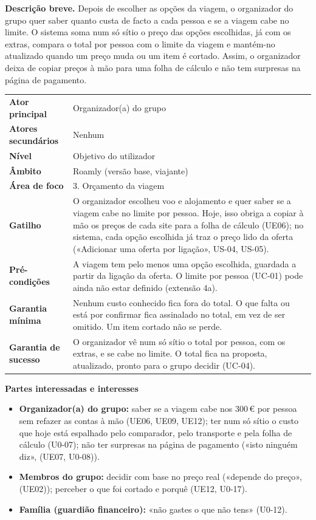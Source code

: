 \documentclass[11pt,a4paper]{article}
\newcommand{\reg}[1]{{\footnotesize\textcolor{pendente}{(#1)}}}
\newenvironment{usecase}[2]{%
  \par\medskip\noindent{\large\bfseries\color{roamly}#1: #2}\par\smallskip\small\noindent\ignorespaces}{\par\medskip}
\newcommand{\ucField}[2]{\textbf{#1} & #2 \\}
\begin{document}
\begin{usecase}{UC-02}{Saber o total real por pessoa}
\textbf{Descrição breve.} Depois de escolher as opções da viagem, o organizador do grupo quer saber quanto custa de facto a cada pessoa e se a viagem cabe no limite. O sistema soma num só sítio o preço das opções escolhidas, já com os extras, compara o total por pessoa com o limite da viagem e mantém-no atualizado quando um preço muda ou um item é cortado. Assim, o organizador deixa de copiar preços à mão para uma folha de cálculo e não tem surpresas na página de pagamento.\par\smallskip
\begin{tabularx}{\textwidth}{@{}>{\raggedright\arraybackslash}p{3.4cm}L@{}}
\toprule
\ucField{Ator principal}{Organizador(a) do grupo}
\ucField{Atores secundários}{Nenhum}
\ucField{Nível}{Objetivo do utilizador}
\ucField{Âmbito}{Roamly (versão base, viajante)}
\ucField{Área de foco}{3. Orçamento da viagem}
\ucField{Gatilho}{O organizador escolheu voo e alojamento e quer saber se a viagem cabe no limite por pessoa. Hoje, isso obriga a copiar à mão os preços de cada site para a folha de cálculo \reg{UE06}; no sistema, cada opção escolhida já traz o preço lido da oferta («Adicionar uma oferta por ligação», US-04, US-05).}
\ucField{Pré-condições}{A viagem tem pelo menos uma opção escolhida, guardada a partir da ligação da oferta. O limite por pessoa (UC-01) pode ainda não estar definido (extensão 4a).}
\ucField{Garantia mínima}{Nenhum custo conhecido fica fora do total. O que falta ou está por confirmar fica assinalado no total, em vez de ser omitido. Um item cortado não se perde.}
\ucField{Garantia de sucesso}{O organizador vê num só sítio o total por pessoa, com os extras, e se cabe no limite. O total fica na proposta, atualizado, pronto para o grupo decidir (UC-04).}
\bottomrule
\end{tabularx}

\medskip
\textbf{Partes interessadas e interesses}
\begin{itemize}
  \item \textbf{Organizador(a) do grupo:} saber se a viagem cabe nos 300\,€ por pessoa sem refazer as contas à mão \reg{UE06, UE09, UE12}; ter num só sítio o custo que hoje está espalhado pelo comparador, pelo transporte e pela folha de cálculo \reg{U0-07}; não ter surpresas na página de pagamento («isto ninguém diz», \reg{UE07, U0-08}).
  \item \textbf{Membros do grupo:} decidir com base no preço real («depende do preço», \reg{UE02}); perceber o que foi cortado e porquê \reg{UE12, U0-17}.
  \item \textbf{Família (guardião financeiro):} «não gastes o que não tens» \reg{U0-12}.
\end{itemize}


\end{usecase}
\end{document}
